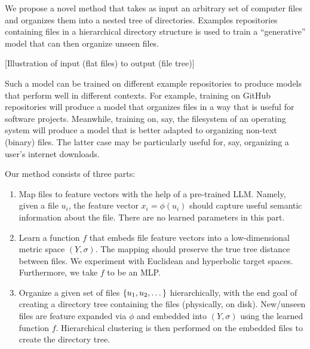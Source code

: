 \documentclass{article}
\begin{document}
We propose a novel method that takes as input an arbitrary set of computer files and organizes them into a nested tree of directories. Examples repositories containing files in a hierarchical directory structure is used to train a ``generative'' model that can then organize unseen files.

  [Illustration of input (flat files) to output (file tree)]

Such a model can be trained on different example repositories to produce models that perform well in different contexts. For example, training on GitHub repositories will produce a model that organizes files in a way that is useful for software projects. Meanwhile, training on, say, the filesystem of an operating system will produce a model that is better adapted to organizing non-text (binary) files. The latter case may be particularly useful for, say, organizing a user's internet downloads.


Our method consists of three parts:

\begin{enumerate}
  \item Map files to feature vectors with the help of a pre-trained LLM. Namely, given a file $u_i$, the feature vector $x_i = \phi(u_i)$ should capture useful semantic information about the file. There are no learned parameters in this part.
  \item Learn a function $f$ that embeds file feature vectors into a low-dimensional metric space $(Y, \sigma)$. The mapping should preserve the true tree distance between files. We experiment with Euclidean and hyperbolic target spaces. Furthermore, we take $f$ to be an MLP.
  \item Organize a given set of files $\qty{u_1, u_2, \dots}$ hierarchically, with the end goal of creating a directory tree containing the files (physically, on disk). New/unseen files are feature expanded via $\phi$ and embedded into $(Y, \sigma)$ using the learned function $f$. Hierarchical clustering is then performed on the embedded files to create the directory tree.
\end{enumerate}
\end{document}
